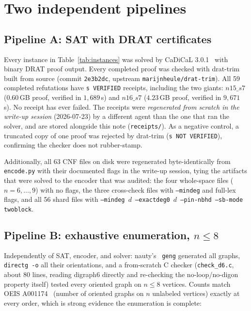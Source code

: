 \documentclass[11pt]{article}
\begin{document}
\section{Two independent pipelines}\label{sec:pipelines}

\subsection{Pipeline A: SAT with DRAT certificates}

Every instance in Table~\ref{tab:instances} was solved by CaDiCaL
3.0.1~\cite{Cadical} with binary DRAT proof output. Every completed proof
was checked with drat-trim~\cite{DratTrim} built from source (commit
\texttt{2e3b2dc}, upstream \texttt{marijnheule/drat-trim}). All 59
completed refutations have \texttt{s VERIFIED} receipts, including the two
giants: $n15\_s7$ ($0.60$\,GB proof, verified in $1{,}689$\,s) and
$n16\_s7$ ($4.23$\,GB proof, verified in $9{,}671$\,s). No receipt has
ever failed. The receipts were \emph{regenerated from scratch in the write-up session}
(2026-07-23) by a different agent than the one that ran the solver, and are
stored alongside this note (\texttt{receipts/}). As a negative control, a truncated copy of
one proof was rejected by drat-trim (\texttt{s NOT VERIFIED}), confirming
the checker does not rubber-stamp.

Additionally, all 63 CNF files on disk were regenerated byte-identically
from \texttt{encode.py} with their documented flags in the write-up
session, tying the artifacts that were solved to the encoder that was
audited: the four whole-space files ($n = 6,\dots,9$) with no flags, the
three cross-check files with \texttt{--mindeg} and full-lex flags, and all
56 shard files with
\texttt{--mindeg $d$ --exactdeg0 $d$ --pin-nbhd --sb-mode twoblock}.

\subsection{Pipeline B: exhaustive enumeration, $n \le 8$}

Independently of SAT, encoder, and solver: nauty's~\cite{Nauty}
\texttt{geng} generated all graphs, \texttt{directg -o} all their
orientations, and a from-scratch C checker (\texttt{check\_d6.c}, about 80
lines, reading digraph6 directly and re-checking the no-loop/no-digon
property itself) tested every oriented graph on $n \le 8$ vertices. Counts
match OEIS A001174~\cite{OEIS} (number of oriented graphs on $n$ unlabeled
vertices) exactly at every order, which is strong evidence the enumeration
is complete:
\end{document}

